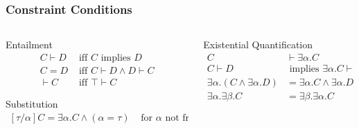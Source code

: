 \documentclass[aspectratio=169]{beamer}
\begin{document}
\begin{frame}[fragile]
  \frametitle{Constraint Conditions}
  \begin{columns}
    \begin{column}{0.48\textwidth}
      \begin{block}{Entailment}
        \setlength\abovedisplayskip{0pt}
        \begin{align*}
          C ⊢ D & \text{ iff } C \text{ implies } D \\
          C = D & \text{ iff } C ⊢ D ∧ D ⊢ C        \\
          ⊢C    & \text{ iff } ⊤ ⊢ C
        \end{align*}
      \end{block}
      \begin{block}{Substitution}
        \setlength\abovedisplayskip{0pt}
        \begin{align*}
          [τ/α]C = ∃α.C ∧ (α = τ) & \text{ for } α \text{ not free in } τ
        \end{align*}
      \end{block}
    \end{column}
    \begin{column}{0.45\textwidth}
      \begin{block}{Existential Quantification}
        \setlength\abovedisplayskip{0pt}
        \begin{align*}
          C             & ⊢ ∃α. C                      \\
          C ⊢ D         & \text{ implies } ∃α.C ⊢ ∃α.D \\
          ∃α.(C ∧ ∃α.D) & = ∃α.C ∧ ∃α.D                \\
          ∃α. ∃β.C      & = ∃β. ∃α.C
        \end{align*}
      \end{block}
    \end{column}
  \end{columns}
\end{frame}
\end{document}
